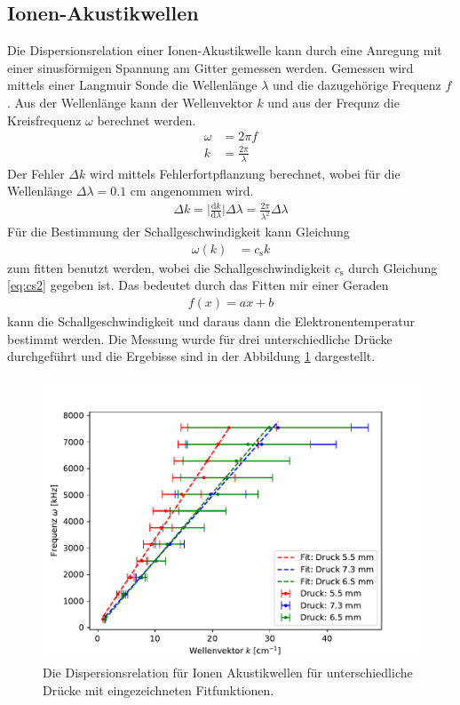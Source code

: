 \subsection{Ionen-Akustikwellen}
Die Dispersionsrelation einer Ionen-Akustikwelle kann durch eine Anregung mit einer sinusförmigen Spannung am Gitter gemessen werden. Gemessen wird mittels einer Langmuir Sonde die Wellenlänge $\lambda$ und die dazugehörige Frequenz $f$. Aus der Wellenlänge kann der Wellenvektor $k$ und aus der Frequnz die Kreisfrequenz  $\omega$ berechnet werden.
\begin{align}
  \omega & = 2 \pi f \\
  k & = \frac{2 \pi}{\lambda}
\end{align}
Der Fehler $\Delta k$ wird mittels Fehlerfortpflanzung berechnet, wobei für die Wellenlänge $\Delta \lambda=0.1$ cm angenommen wird.
\begin{align}
  \Delta k = \bigl| \frac{\mathrm{d} k}{\mathrm{d} \lambda} \bigl| \Delta \lambda = \frac{2\pi}{\lambda^2} \Delta \lambda
\end{align}
Für die Bestimmung der Schallgeschwindigkeit kann Gleichung
\begin{align}
\omega (k)
    &=c_\text{s}k
\end{align}
zum fitten benutzt werden, wobei die Schallgeschwindigkeit $c_{\mathrm{s}}$ durch Gleichung \eqref{eq:cs2} gegeben ist. Das bedeutet durch das Fitten mir einer Geraden
\begin{align}
  f(x)= a x +b
  \label{eq:fit_Dispersion}
\end{align}
kann die Schallgeschwindigkeit und daraus dann die Elektronentemperatur bestimmt werden. Die Messung wurde für drei unterschiedliche Drücke durchgeführt und die Ergebisse sind in der Abbildung \ref{fig:3_3_Dispersion} dargestellt.
\begin{figure}[H]
\centering
\includegraphics[scale=0.6]{3_3_Dispersion.pdf}
\caption{Die Dispersionsrelation für Ionen Akustikwellen für unterschiedliche Drücke mit eingezeichneten Fitfunktionen.}
\label{fig:3_3_Dispersion}
\end{figure}
